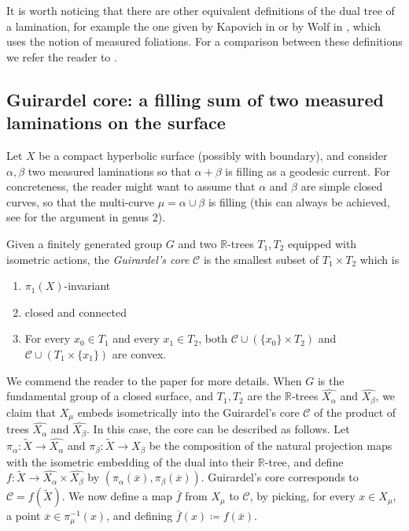 \documentclass[12pt,article]{amsart}
\numberwithin{equation}{section}
\numberwithin{figure}{section}
\theoremstyle{definition}
\theoremstyle{plain}
\newcommand*{\wt}[1]{\widetilde{#1}}
\begin{document}
It is worth noticing that there are other equivalent definitions of the dual tree of a lamination, for example the one given by Kapovich in {\cite[Section 11.12]{Kap00:Kapovich2000HyperbolicMA}} or by Wolf in \cite{W98:Duals}, which uses the notion of measured foliations. For a comparison between these definitions we refer the reader to \cite{DeRosa23Thesis}. 

\subsection{Guirardel core: a filling sum of two measured laminations on the surface}
\label{ex:guirardelcore}


Let $X$ be a compact hyperbolic surface (possibly with boundary), and consider $\alpha,\beta$ two measured laminations so that $\alpha+\beta$ is filling as a geodesic current. For concreteness, the reader might want to assume that $\alpha$ and $\beta$ are simple closed curves, so that the multi-curve $\mu=\alpha \cup \beta$ is filling (this can always be achieved, see \cite[1.3.2]{FM12:Primer} for the argument in genus 2). 

Given a finitely generated group $G$ and two $\mathbb{R}$-trees $T_1, T_2$ equipped with isometric actions, the \emph{Guirardel's core} $\mathcal{C}$ is the smallest subset of $T_1 \times T_2$ which is
\begin{enumerate}
\item $\pi_1(X)$-invariant
\item closed and connected
\item For every $x_0 \in T_1$ and every $x_1 \in T_2$, both $\mathcal{C} \cup (\{ x_0 \} \times T_{2})$ and $\mathcal{C} \cup (T_{1} \times \{ x_1 \})$ are convex.
\end{enumerate}
We commend the reader to the paper \cite[Section~2.2, Example~3]{Gui05:Coeur} for more details. 
When $G$ is the fundamental group of a closed surface, and $T_1,T_2$ are the $\mathbb{R}$-trees $\widehat{X_{\alpha}}$ and $\widehat{X_{\beta}}$,
we claim that $X_{\mu}$ embeds isometrically into the Guirardel's core $\mathcal{C}$ of the product of trees $\widehat{X_{\alpha}}$ and $\widehat{X_{\beta}}$.
In this case, the core can be described as follows.
Let $\pi_{\alpha} \colon \wt{X} \to \widehat{X_{\alpha}}$ and $\pi_{\beta} \colon \wt{X} \to \widehat{X_{\beta}}$ be the composition of the natural projection maps with the isometric embedding of the dual into their $\mathbb{R}$-tree, and define
$f \colon \wt{X} \to \widehat{X_{\alpha}} \times \widehat{X_{\beta}}$ by $(\pi_{\alpha}(\overline{x}),\pi_{\beta}(\overline{x}))$.
Guirardel's core corresponds to $\mathcal{C}=f(\wt{X})$. 
We now define a map $\overline{f}$ from $X_{\mu}$ to $\mathcal{C}$,
by picking, for every $x \in X_{\mu}$, a point $\overline{x} \in \pi_{\mu}^{-1}(x)$, and defining $\overline{f}(x)\coloneqq f(\bar{x})$.
\end{document}
